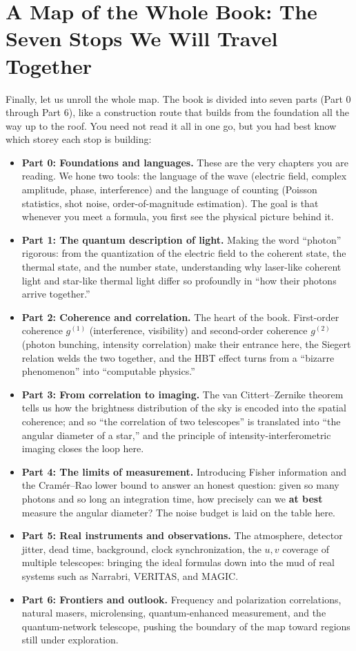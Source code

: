 \section{A Map of the Whole Book: The Seven Stops We Will Travel Together}
\label{sec:e00-map}

Finally, let us unroll the whole map. The book is divided into seven parts (Part 0 through Part 6), like a construction route that builds from the foundation all the way up to the roof. You need not read it all in one go, but you had best know which storey each stop is building:

\begin{itemize}
  \item \textbf{Part 0: Foundations and languages.} These are the very chapters you are reading. We hone two tools: the language of the wave (electric field, complex amplitude, phase, interference) and the language of counting (Poisson statistics, shot noise, order-of-magnitude estimation). The goal is that whenever you meet a formula, you first see the physical picture behind it.
  \item \textbf{Part 1: The quantum description of light.} Making the word ``photon'' rigorous: from the quantization of the electric field to the coherent state, the thermal state, and the number state, understanding why laser-like coherent light and star-like thermal light differ so profoundly in ``how their photons arrive together.''
  \item \textbf{Part 2: Coherence and correlation.} The heart of the book. First-order coherence \(g^{(1)}\) (interference, visibility) and second-order coherence \(g^{(2)}\) (photon bunching, intensity correlation) make their entrance here, the Siegert relation welds the two together, and the HBT effect turns from a ``bizarre phenomenon'' into ``computable physics.''
  \item \textbf{Part 3: From correlation to imaging.} The van Cittert--Zernike theorem tells us how the brightness distribution of the sky is encoded into the spatial coherence; and so ``the correlation of two telescopes'' is translated into ``the angular diameter of a star,'' and the principle of intensity-interferometric imaging closes the loop here.
  \item \textbf{Part 4: The limits of measurement.} Introducing Fisher information and the Cramér--Rao lower bound to answer an honest question: given so many photons and so long an integration time, how precisely can we \textbf{at best} measure the angular diameter? The noise budget is laid on the table here.
  \item \textbf{Part 5: Real instruments and observations.} The atmosphere, detector jitter, dead time, background, clock synchronization, the \(u,v\) coverage of multiple telescopes: bringing the ideal formulas down into the mud of real systems such as Narrabri, VERITAS, and MAGIC.
  \item \textbf{Part 6: Frontiers and outlook.} Frequency and polarization correlations, natural masers, microlensing, quantum-enhanced measurement, and the quantum-network telescope, pushing the boundary of the map toward regions still under exploration.
\end{itemize}

